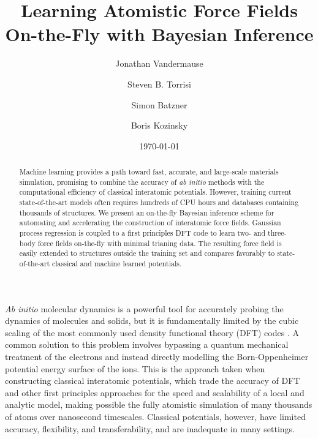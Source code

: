 \documentclass[%
reprint,
superscriptaddress,
amsmath,amssymb,
aps,
prl,
]{revtex4-1}
\begin{document}
\title{Learning Atomistic Force Fields On-the-Fly with Bayesian Inference}

\author{Jonathan Vandermause}

\author{Steven B. Torrisi}

\author{Simon Batzner}

\author{Boris Kozinsky}


\date{\today}

\begin{abstract}
  Machine learning provides a path toward fast, accurate, and large-scale materials simulation, promising to combine the accuracy of \textit{ab initio} methods with the computational efficiency of classical interatomic potentials. However, training current state-of-the-art models often requires hundreds of CPU hours and databases containing thousands of structures. We present an on-the-fly Bayesian inference scheme for automating and accelerating the construction of interatomic force fields. Gaussian process regression is coupled to a first principles DFT code to learn two- and three-body force fields on-the-fly with minimal trianing data. The resulting force field is easily extended to structures outside the training set and compares favorably to state-of-the-art classical and machine learned potentials.
\end{abstract}

\maketitle

\textit{Ab initio} molecular dynamics is a powerful tool for
accurately probing the dynamics of molecules and solids, but it is fundamentally limited by the cubic scaling of the most commonly used density functional theory (DFT) codes \cite{kohn1999nobel}. A common solution to this problem involves bypassing a quantum mechanical treatment of the electrons and instead directly modelling the Born-Oppenheimer potential energy surface of the ions. This is the approach taken when constructing classical interatomic potentials, which trade the accuracy of DFT and other first principles approaches for the speed and scalability of a local and analytic model, making possible the fully atomistic simulation of many thousands of atoms over nanosecond timescales. Classical potentials, however, have limited accuracy, flexibility, and transferability, and are inadequate in many settings.
\end{document}
